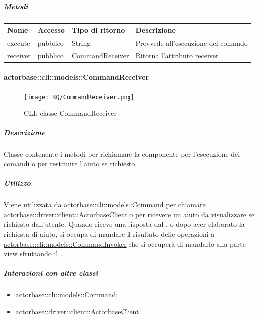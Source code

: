 \documentclass{scalatekids-article}
\begin{document}
\subparagraph{Metodi}

\begin{tabular}{| p{3cm} | p{1.5cm} | p{3.5cm} | p{9cm} |}
  \hline
  Nome & Accesso & Tipo di ritorno & Descrizione\\
  \hline
  execute & pubblico & String & Provvede all'esecuzione del comando\\
  \hline
  receiver & pubblico & \hyperref[sec:actorbase::cli::models::CommandReceiver]{CommandReceiver} & Ritorna l'attributo receiver\\
  \hline
\end{tabular}

\paragraph{actorbase::cli::models::CommandReceiver}
\label{sec:actorbase::cli::models::CommandReceiver}

\begin{figure}[H]
  \begin{center}
    \texttt{[image: RQ/CommandReceiver.png]}
    \caption{CLI: classe CommandReceiver}
  \end{center}
\end{figure}

\subparagraph{Descrizione}

Classe contenente i metodi per richiamare la componente  per
l'esecuzione dei comandi o per restituire l'aiuto se richiesto.

\subparagraph{Utilizzo}

Viene utilizzata da \hyperref[sec:actorbase::cli::models::Command]{actorbase::cli::models::Command} per chiamare
\hyperref[sec:actorbase::driver::client::ActorbaseClient]{actorbase::driver::client::ActorbaseClient} o per ricevere un aiuto da
visualizzare se richiesto dall'utente. Quando riceve una risposta dal , o dopo aver elaborato la richiesta
di aiuto, si occupa di mandare il risultato delle operazioni a \hyperref[sec:actorbase::cli::models::CommandInvoker]{actorbase::cli::models::CommandInvoker}
che si occuperà di mandarlo alla parte view sfruttando il  .

\subparagraph{Interazioni con altre classi}

\begin{itemize}
\item \hyperref[sec:actorbase::cli::models::Command]{actorbase::cli::models::Command};
\item \hyperref[sec:actorbase::driver::client::ActorbaseClient]{actorbase::driver::client::ActorbaseClient}.
\end{itemize}
\end{document}
